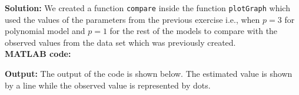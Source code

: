 \noindent \textbf{Solution:} We created a function \texttt{compare} inside the function \texttt{plotGraph} which used the values of the parameters from the previous exercise i.e., when $p = 3$ for polynomial model and $p = 1$ for the rest of the models to compare with the observed values from the data set which was previously created.\\
 
 \noindent \textbf{MATLAB code:}


 \noindent \textbf{Output:}
 \noindent The output of the code is shown below. The estimated value is shown by a line while the observed value is represented by dots.
\begin{figure}[H]
    \centering
    \qquad
\end{figure}
